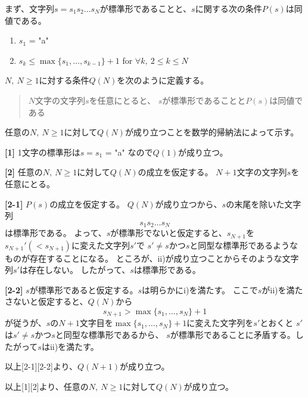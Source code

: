 \documentclass{article}
\makeatletter
\renewenvironment{proof}[1][\proofname]{\par
        \pushQED{\qed}
        \normalfont
        \topsep6\p@\@plus6\p@ \trivlist
        \item[\hskip\labelsep{\bfseries #1}\@addpunct{\bfseries}]\ignorespaces
    }{%
        \popQED\endtrivlist\@endpefalse
    }
\renewcommand{\proofname}{\underline{証明.}}
\makeatother
\begin{document}
まず、文字列$s = s_1 s_2 \dots s_N$が標準形であることと、$s$に関する次の条件$P(s)$は同値である。

\begin{enumerate}
    \renewcommand{\labelenumi}{\roman{enumi}).}
    \item $s_1$ = "a"
    \item $s_k \leq \max\{s_1, \dots, s_{k-1}\} + 1$ \quad for $\forall k,\ 2 \leq k \leq N$
\end{enumerate}

\begin{proof}
    $N,\ N \geq 1$に対する条件$Q(N)$を次のように定義する。
    \begin{quote}
        $N$文字の文字列$s$を任意にとると、
        $s$が標準形であることと$P(s)$は同値である
    \end{quote}

    任意の$N,\ N \geq 1$に対して$Q(N)$が成り立つことを数学的帰納法によって示す。

    \textbf{[1]}
    1文字の標準形は$s = s_1$ = "a" なので$Q(1)$が成り立つ。

    \textbf{[2]}
    任意の$N,\ N \geq 1$に対して$Q(N)$の成立を仮定する。
    $N+1$文字の文字列$s$を任意にとる。

    \leftskip=15pt
        \textbf{[2-1]}
        $P(s)$の成立を仮定する。
        $Q(N)$が成り立つから、$s$の末尾を除いた文字列
        \begin{equation}
            s_1 s_2 \dots s_{N}
        \end{equation}
        は標準形である。
        よって、$s$が標準形でないと仮定すると、$s_{N+1}$を$s_{N+1}' (< s_{N+1})$に変えた文字列$s'$で
        $s' \neq s$かつ$s$と同型な標準形であるようなものが存在することになる。
        ところが、ii)が成り立つことからそのような文字列$s'$は存在しない。
        したがって、$s$は標準形である。

        \textbf{[2-2]}
        $s$が標準形であると仮定する。$s$は明らかにi)を満たす。
        ここで$s$がii)を満たさないと仮定すると、$Q(N)$から
        \begin{equation}
            s_{N+1} > \max\{s_1, \dots, s_N\} + 1
        \end{equation}
        が従うが、$s$の$N+1$文字目を$\max\{s_1, \dots, s_N\} + 1$に変えた文字列を$s'$とおくと
        $s'$は$s' \neq s$かつ$s$と同型な標準形であるから、
        $s$が標準形であることに矛盾する。したがって$s$はii)を満たす。

    \leftskip=0pt

    以上[2-1][2-2]より、$Q(N+1)$が成り立つ。

    以上[1][2]より、任意の$N,\ N \geq 1$に対して$Q(N)$が成り立つ。
\end{proof}
\end{document}
